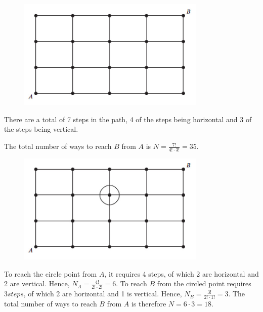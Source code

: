 \documentclass[a4paper,12pt]{article}
\begin{document}
\begin{figure}[ht!]
\centering
\includegraphics[width=90mm]{RossFigure001.jpg}
\end{figure}

There are a total of 7 steps in the path, 4 of the steps being horizontal and 3 of the steps being vertical. 

The total number of ways to reach $B$ from $A$ is $N = \frac{7!}{4! \cdot 3!} = 35$.

\pagebreak
\vspace{4mm}

\begin{figure}[ht!]
\centering
\includegraphics[width=90mm]{RossFigure002.jpg}
\end{figure}

To reach the circle point from $A$, it requires 4 steps, of which 2 are horizontal and 2 are vertical. Hence, $N_A = \frac{4!}{2! \cdot 2!} = 6$. To reach $B$ from the circled point requires $3 steps$, of which 2 are horizontal and 1 is vertical. Hence, $N_B = \frac{3!}{2! \cdot 1!} = 3$. The total number of ways to reach $B$ from $A$ is therefore $N = 6 \cdot 3 = 18$.
\end{document}
